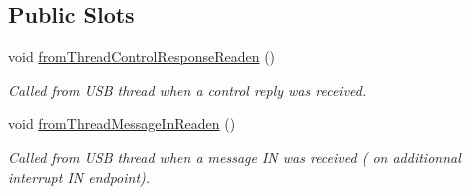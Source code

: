 \subsection*{Public Slots}
\begin{DoxyCompactItemize}
\item 
void \hyperlink{classmdt_usb_port_manager_af043c75c74665b23d13f3cb73150935c}{fromThreadControlResponseReaden} ()
\begin{DoxyCompactList}\small\item\em Called from USB thread when a control reply was received. \end{DoxyCompactList}\item 
\hypertarget{classmdt_usb_port_manager_a9b7154590a4eb267aff4e11ba53dd7aa}{
void \hyperlink{classmdt_usb_port_manager_a9b7154590a4eb267aff4e11ba53dd7aa}{fromThreadMessageInReaden} ()}
\label{classmdt_usb_port_manager_a9b7154590a4eb267aff4e11ba53dd7aa}

\begin{DoxyCompactList}\small\item\em Called from USB thread when a message IN was received ( on additionnal interrupt IN endpoint). \end{DoxyCompactList}\end{DoxyCompactItemize}
